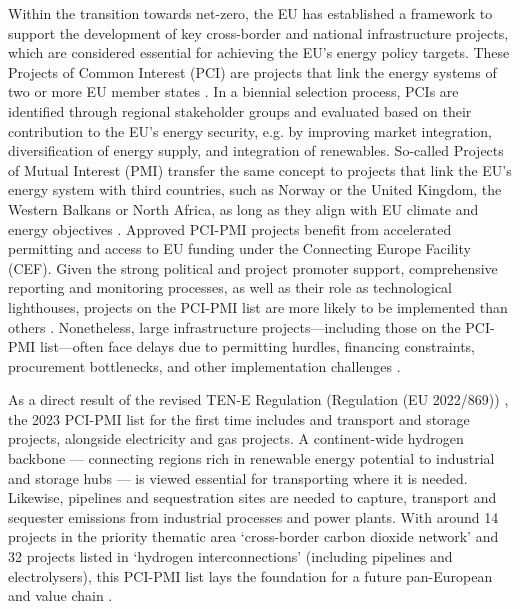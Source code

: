 \documentclass[final,5p,times,twocolumn,sort&compress]{elsarticle}
\begin{document}
Within the transition towards net-zero, the EU has established a framework to support the development of key cross-border and national infrastructure projects, which are considered essential for achieving the EU's energy policy targets. These Projects of Common Interest (PCI) are projects that link the energy systems of two or more EU member states \cite{europeancommissionRegulationEUNo2022}. In a biennial selection process, PCIs are identified through regional stakeholder groups and evaluated based on their contribution to the EU's energy security, e.g. by improving market integration, diversification of energy supply, and integration of renewables. So-called Projects of Mutual Interest (PMI) transfer the same concept to projects that link the EU's energy system with third countries, such as Norway or the United Kingdom, the Western Balkans or North Africa, as long as they align with EU climate and energy objectives \cite{europeancommissionCommissionDelegatedRegulation2023}. Approved PCI-PMI projects benefit from accelerated permitting and access to EU funding under the Connecting Europe Facility (CEF). Given the strong political and project promoter support, comprehensive reporting and monitoring processes, as well as their role as technological lighthouses, projects on the PCI-PMI list are more likely to be implemented than others \cite{europeancommission.directorategeneralforenergy.InvestmentNeedsEuropean2025}. Nonetheless, large infrastructure projects—including those on the PCI-PMI list—often face delays due to permitting hurdles, financing constraints, procurement bottlenecks, and other implementation challenges \cite{acerConsolidatedReportProgress2023}. 

As a direct result of the revised TEN-E Regulation (Regulation (EU 2022/869)) \cite{europeanparliamentRegulationEU20222022}, the 2023 PCI-PMI list \cite{europeancommissionCommissionDelegatedRegulation2023,europeancommissionPCIPMITransparencyPlatform2024} for the first time includes  and  transport and storage projects, alongside electricity and gas projects. A continent-wide hydrogen backbone --- connecting regions rich in renewable energy potential to industrial and storage hubs --- is viewed essential for transporting  where it is needed. Likewise,  pipelines and sequestration sites are needed to capture, transport and sequester emissions from industrial processes and power plants. With around 14 projects in the priority thematic area `cross-border carbon dioxide network' and 32 projects listed in `hydrogen interconnections' (including pipelines and electrolysers), this PCI-PMI list lays the foundation for a future pan-European  and  value chain \cite{europeancommissionAnnexFirstUnion2023}.
\end{document}
